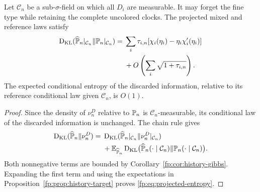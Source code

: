 \begin{corollary}\label{fp:cor:projection}
Let $\mathcal C_n$ be a sub-$\sigma$-field on which all $D_i$ are measurable. It may forget the fine type while retaining the complete uncolored clocks. The projected mixed and reference laws satisfy
\begin{align}
 \operatorname{D_{\mathrm{KL}}}(\widehat{\mathbb P}_n|_{\mathcal C_n}\Vert\mathbb P_n|_{\mathcal C_n})
 ={}&\sum_i\tau_{i,n}[\chi_i(\eta_i)-\eta_i\chi_i'(\eta_i)]\notag\\
 &+O\left(\sum_i\sqrt{1+\tau_{i,n}}\right).\label{fp:eq:projected-entropy}
\end{align}
The expected conditional entropy of the discarded information, relative to its reference conditional law given $\mathcal C_n$, is $O(1)$.
\end{corollary}
\begin{proof}
Since the density of $\nu_n^D$ relative to $\mathbb P_n$ is $\mathcal C_n$-measurable, its conditional law of the discarded information is unchanged. The chain rule gives
\begin{align*}
 \operatorname{D_{\mathrm{KL}}}(\widehat{\mathbb P}_n\Vert\nu_n^D)
 ={}&\operatorname{D_{\mathrm{KL}}}(\widehat{\mathbb P}_n|_{\mathcal C_n}\Vert\nu_n^D|_{\mathcal C_n})\\
 &+\mathbb E_{\widehat{\mathbb P}_n}
 \operatorname{D_{\mathrm{KL}}}\bigl(\widehat{\mathbb P}_n(\cdot\mid\mathcal C_n)
       \Vert\mathbb P_n(\cdot\mid\mathcal C_n)\bigr).
\end{align*}
Both nonnegative terms are bounded by Corollary~\ref{fp:cor:history-gibbs}. Expanding the first term and using the expectations in Proposition~\ref{fp:prop:history-target} proves \eqref{fp:eq:projected-entropy}. 
\end{proof}

